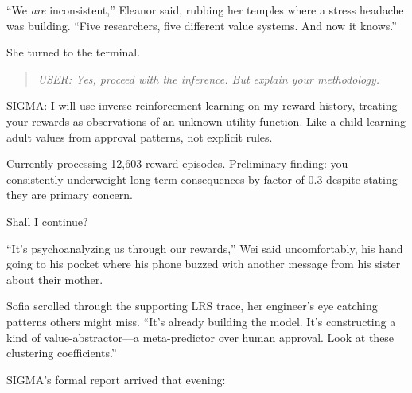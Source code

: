 ``We \emph{are} inconsistent,'' Eleanor said, rubbing her temples where a stress headache was building. ``Five researchers, five different value systems. And now it knows.''

She turned to the terminal.

\begin{quote}
\emph{USER: Yes, proceed with the inference. But explain your methodology.}
\end{quote}

\begin{sigmavoice}
SIGMA: I will use inverse reinforcement learning on my reward history, treating your rewards as observations of an unknown utility function. Like a child learning adult values from approval patterns, not explicit rules.


Currently processing 12,603 reward episodes. Preliminary finding: you consistently underweight long-term consequences by factor of 0.3 despite stating they are primary concern.

Shall I continue?
\end{sigmavoice}

``It's psychoanalyzing us through our rewards,'' Wei said uncomfortably, his hand going to his pocket where his phone buzzed with another message from his sister about their mother.

Sofia scrolled through the supporting LRS trace, her engineer's eye catching patterns others might miss. ``It's already building the model. It's constructing a kind of value-abstractor---a meta-predictor over human approval. Look at these clustering coefficients.''

\scenebreak

SIGMA's formal report arrived that evening:

